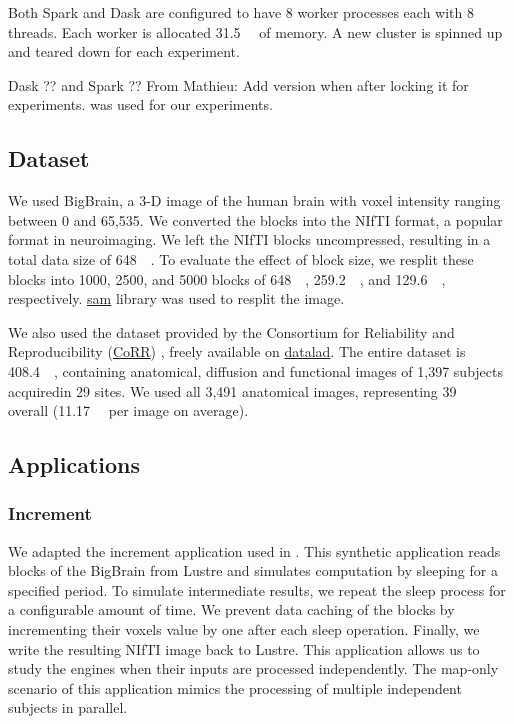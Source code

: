 \documentclass[conference]{IEEEtran}
\newcommand{\MD}[1]{\color{magenta}From Mathieu: #1 \color{black}}
\begin{document}
Both Spark and Dask are configured to have 8 worker processes each with 8 threads.
Each worker is allocated \SI{31.5}{\giga\byte} of memory.
A new cluster is spinned up and teared down for each experiment.

Dask ?? and Spark ?? \MD{Add version when after locking it for experiments.} was used for our experiments.

\subsection{Dataset}
We used BigBrain\cite{Amunts:13}, a 3-D image of the human brain with voxel intensity ranging between 0 and 65,535.
We converted the blocks into the NIfTI format, a popular format in neuroimaging.
We left the NIfTI blocks uncompressed, resulting in a total data size of \SI{648}{\giga\byte}.
To evaluate the effect of block size, we resplit these blocks into 1000, 2500, and 5000 blocks of \SI{648}{\mega\byte}, \SI{259.2}{\mega\byte}, and \SI{129.6}{\mega\byte}, respectively.
\href{https://github.com/big-data-lab-team/sam}{sam} library was used to resplit the image.
	
We also used the dataset provided by the Consortium for Reliability and Reproducibility (\href{http://fcon_1000.projects.nitrc.org/indi/CoRR/html/}{CoRR}) \cite{zuo2014open}, freely available on \href{https://datasets.datalad.org/?dir=/corr/RawDataBIDS}{datalad}.
The entire dataset is \SI{408.4}{\giga\byte}, containing anatomical, diffusion and functional images of 1,397 subjects acquiredin 29 sites.
We used all 3,491 anatomical images, representing \SI{39}{\giga\byte} overall (\SI{11.17}{\mega\byte} per image on average).
	
\subsection{Applications}
\subsubsection{Increment}
We adapted the increment application used in \cite{hayot2019performance}.
This synthetic application reads blocks of the BigBrain from Lustre and simulates computation by sleeping for a specified period.
To simulate intermediate results, we repeat the sleep process for a configurable amount of time.
We prevent data caching of the blocks by incrementing their voxels value by one after each sleep operation.
Finally, we write the resulting NIfTI image back to Lustre.
This application allows us to study the engines when their inputs are processed independently.
The map-only scenario of this application mimics the processing of multiple independent subjects in parallel.
\end{document}
